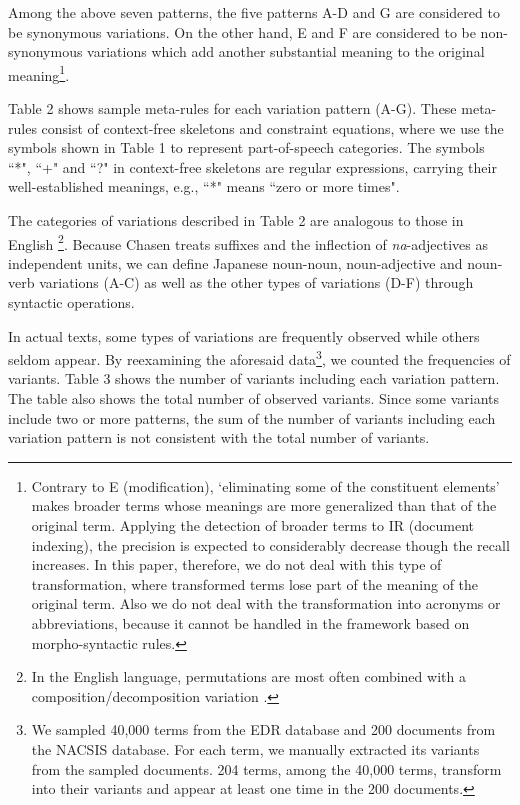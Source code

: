 \vspace*{5mm}
Among the above seven patterns, the five patterns A-D and G are considered to be synonymous variations. On the other hand, E and F are considered to be non-synonymous variations which add another substantial meaning to the original meaning\footnote{Contrary to E (modification), `eliminating some of the constituent elements' makes broader terms whose meanings are more generalized than that of the original term. Applying the detection of broader terms to IR (document indexing), the precision is expected to considerably decrease though the recall increases. In this paper, therefore, we do not deal with this type of transformation, where transformed terms lose part of the meaning of the original term. Also we do not deal with the transformation into acronyms or abbreviations, because it cannot be handled in the framework based on morpho-syntactic rules.}.

Table 2 shows sample meta-rules for each variation pattern (A-G). These meta-rules consist of context-free skeletons and constraint equations, where we use the symbols shown in Table 1 to represent part-of-speech categories. The symbols ``*", ``+" and ``?" in context-free skeletons are regular expressions, carrying their well-established meanings, e.g., ``*" means ``zero or more times".

The categories of variations described in Table 2 are analogous to those in English \cite{Jacquemin97} \footnote{In the English language, permutations are most often combined with a composition/decomposition variation \cite{Daille}.}. Because Chasen treats suffixes and the inflection of {\it na}-adjectives as independent units, we can define Japanese noun-noun, noun-adjective and noun-verb variations (A-C) as well as the other types of variations (D-F) through syntactic operations.

In actual texts, some types of variations are frequently observed while others seldom appear. By reexamining the aforesaid data\footnote{We sampled 40,000 terms from the EDR database and 200 documents from the NACSIS database. For each term, we manually extracted its variants from the sampled documents. 204 terms, among the 40,000 terms, transform into their variants and appear at least one time in the 200 documents.}, we counted the frequencies of variants. Table 3 shows the number of variants including each variation pattern. The table also shows the total number of observed variants. Since some variants include two or more patterns, the sum of the number of variants including each variation pattern is not consistent with the total number of variants.

